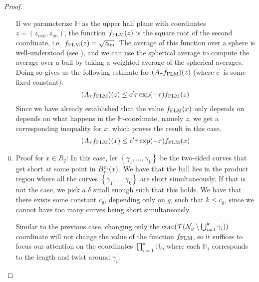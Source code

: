 \begin{proof}
\begin{enumerate}[(i)]
    If we parameterize $\mathbb{H}$ as the upper half plane with coordinates $z = (z_{\mathrm{real}}, z_{\mathrm{im}})$, the function $f_{\mathrm{FLM}}(z)$ is the square root of the second coordinate, i.e.\ $f_{\mathrm{FLM}}(z) = \sqrt{z_{\mathrm{im}}}$.
    The average of this function over a sphere is well-understood (see \cite[Lemma 4.2]{EskinMozes+2022+342+361}), and we can use the spherical average to compute the average over a ball by taking a weighted average of the spherical averages.
    Doing so gives us the following estimate for $(A_{\tau}f_{\mathrm{FLM}})(z)$ (where $c^{\prime}$ is some fixed constant).
    \begin{align*}
      (A_{\tau}f_{\mathrm{FLM}})(z) \leq c^{\prime} \tau \exp(-\tau) f_{\mathrm{FLM}}(z)
    \end{align*}
    Since we have already established that the value $f_{\mathrm{FLM}}(x)$ only depends on depends on what happens in the $\mathbb{H}$-coordinate, namely $z$, we get a corresponding inequality for $x$, which proves the result in this case.
    \begin{align*}
      (A_{\tau}f_{\mathrm{FLM}})(x) \leq c^{\prime} \tau \exp(-\tau) f_{\mathrm{FLM}}(x)
    \end{align*}
  \item Proof for $x \in R_2$: In this case, let $\left\{ \gamma_1, \ldots, \gamma_k \right\}$ be the two-sided curves that get short at some point in $B_{\tau}^{\varepsilon_t}(x)$.
    We have that the ball lies in the product region where all the curves $\left\{ \gamma_1, \ldots, \gamma_k \right\}$ are short simultaneously.
    If that is not the case, we pick a $\delta$ small enough such that this holds.
    We have that there exists some constant $c_g$, depending only on $g$, such that $k \leq c_g$, since we cannot have too many curves being short simultaneously.

    Similar to the previous case, changing only the $\mathrm{core}(\mathcal{T}(\mathcal{N}_g \setminus \bigcup_{i=1}^k \gamma_i))$ coordinate will not change the value of the function $f_{\mathrm{FLM}}$, so it suffices to focus our attention on the coordinates $\prod_{i=1}^k \mathbb{H}_i$, where each $\mathbb{H}_i$ corresponds to the length and twist around $\gamma_i$.


\end{enumerate}
\end{proof}
